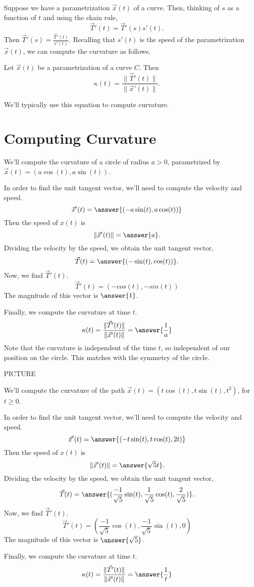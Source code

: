 \documentclass{ximera}
\begin{document}
Suppose we have a parametrization $\vec{x}(t)$ of a curve. Then, thinking of $s$ as a function of $t$ and using the chain rule,
\[
\vec{T}'(t) = \vec{T}'(s)s'(t).
\]
Then $\vec{T}'(s) = \frac{\vec{T}'(t)}{s'(t)}$. Recalling that $s'(t)$ is the speed of the parametrization $\vec{x}(t)$, we can compute the curvature as follows.

\begin{proposition}
Let $\vec{x}(t)$ be a parametrization of a curve $C$. Then
\[
\kappa(t) = \frac{\|\vec{T}'(t)\|}{\|\vec{x}'(t)\|}.
\]
\end{proposition}

We'll typically use this equation to compute curvature.

\section*{Computing Curvature}

\begin{example}
We'll compute the curvature of a circle of radius $a>0$, parametrized by $\vec{x}(t) = (a\cos(t), a\sin(t))$.

In order to find the unit tangent vector, we'll need to compute the velocity and speed.
\[
\vec{x}'(t) = \answer{(-a\sin(t), a\cos(t))}
\]
Then the speed of $x(t)$ is
\[
\|\vec{x}'(t)\| = \answer{a}.
\]
Dividing the velocity by the speed, we obtain the unit tangent vector,
\[
\vec{T}(t) = \answer{(-\sin(t),\cos(t))}.
\]
Now, we find $\vec{T}'(t)$.
\[
\vec{T}'(t) = (-cos(t),-sin(t))
\]
The magnitude of this vector is $\answer{1}$.

Finally, we compute the curvature at time $t$.
\[
\kappa(t) = \frac{\|\vec{T}'(t)\|}{\|\vec{x}'(t)\|} = \answer{\frac{1}{a}}
\]
Note that the curvature is independent of the time $t$, so independent of our position on the circle. This matches with the symmetry of the circle.

PICTURE
\end{example}

\begin{example}
We'll compute the curvature of the path $\vec{x}(t) = (t\cos(t),t\sin(t), t^2)$, for $t\geq 0$.

In order to find the unit tangent vector, we'll need to compute the velocity and speed.
\[
\vec{x}'(t) = \answer{(-t\sin(t), t\cos(t),2t)}
\]
Then the speed of $x(t)$ is
\[
\|\vec{x}'(t)\| = \answer{\sqrt{5}t}.
\]
Dividing the velocity by the speed, we obtain the unit tangent vector,
\[
\vec{T}(t) = \answer{(\frac{-1}{\sqrt{5}}\sin(t),\frac{1}{\sqrt{5}}\cos(t), \frac{2}{\sqrt{5}})}.
\]
Now, we find $\vec{T}'(t)$.
\[
\vec{T}'(t) = (\frac{-1}{\sqrt{5}}\cos(t),\frac{-1}{\sqrt{5}}\sin(t), 0)
\]
The magnitude of this vector is $\answer{\sqrt{5}}$.

Finally, we compute the curvature at time $t$.
\[
\kappa(t) = \frac{\|\vec{T}'(t)\|}{\|\vec{x}'(t)\|} = \answer{\frac{1}{t}}
\]
\end{example}
\end{document}
